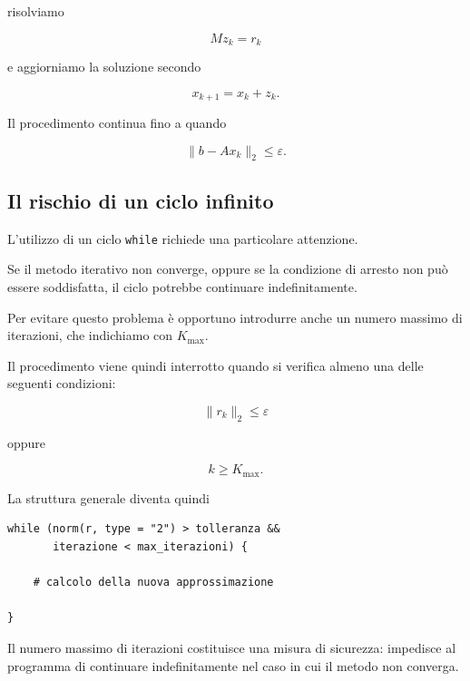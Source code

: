 risolviamo

\begin{equation*}
    Mz_k=r_k
\end{equation*}

e aggiorniamo la soluzione secondo

\begin{equation*}
    x_{k+1}=x_k+z_k.
\end{equation*}

Il procedimento continua fino a quando

\begin{equation*}
    \|b-Ax_k\|_2
    \leq
    \varepsilon.
\end{equation*}


\subsection{Il rischio di un ciclo infinito}

L'utilizzo di un ciclo \texttt{while} richiede una particolare
attenzione.

Se il metodo iterativo non converge, oppure se la condizione di
arresto non può essere soddisfatta, il ciclo potrebbe continuare
indefinitamente.

Per evitare questo problema è opportuno introdurre anche un numero
massimo di iterazioni, che indichiamo con $K_{\max}$.

Il procedimento viene quindi interrotto quando si verifica almeno
una delle seguenti condizioni:

\begin{equation*}
    \|r_k\|_2\leq\varepsilon
\end{equation*}

oppure

\begin{equation*}
    k\geq K_{\max}.
\end{equation*}

La struttura generale diventa quindi

\begin{verbatim}
while (norm(r, type = "2") > tolleranza &&
       iterazione < max_iterazioni) {

    # calcolo della nuova approssimazione

}
\end{verbatim}

Il numero massimo di iterazioni costituisce una misura di
sicurezza: impedisce al programma di continuare indefinitamente
nel caso in cui il metodo non converga.


